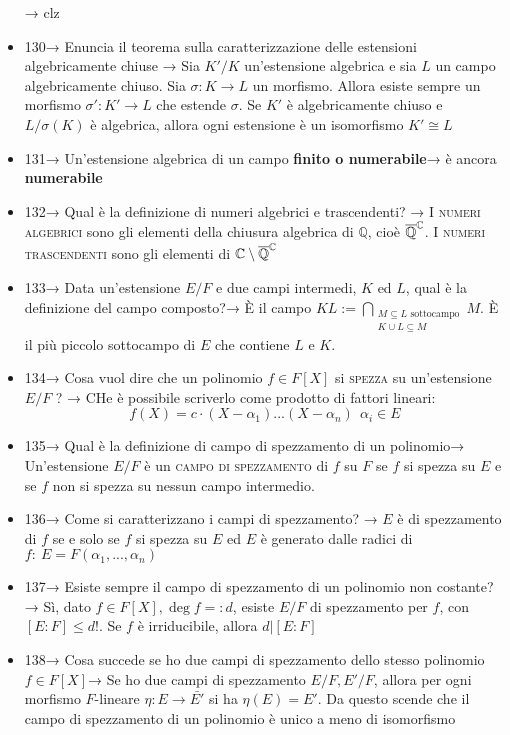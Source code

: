 \documentclass[A4,12pt]{article}
\newcommand{\C}{\mathbb{C}}
\newcommand{\Q}{\mathbb{Q}}
\renewcommand{\subset}{\subseteq}
\begin{document}
\begin{itemize}[noitemsep]
\begin{enumerate}
		\end{enumerate}→ clz
		\item 130→ Enuncia il teorema sulla caratterizzazione delle estensioni algebricamente chiuse → Sia $ K'/K $ un'estensione algebrica e sia $ L $ un campo algebricamente chiuso. Sia $ \sigma:K\to L $ un morfismo. Allora esiste sempre un morfismo $ \sigma':K'\to L $ che estende $ \sigma $. Se $ K' $ è algebricamente chiuso e $ L/\sigma(K) $ è algebrica, allora ogni estensione è un isomorfismo $ K'\cong L $
		\item 131→ Un'estensione algebrica di un campo \textbf{finito o numerabile}→ è ancora \textbf{numerabile}
		\item 132→ Qual è la definizione di numeri algebrici e trascendenti? → I \textsc{numeri algebrici } sono gli elementi della chiusura algebrica di $ \Q $, cioè $ \overline{\Q}\strut^{\C} $. I \textsc{numeri trascendenti} sono gli elementi di $ \C\setminus \overline{\Q}\strut^{\C}  $
		\item 133→ Data un'estensione $ E/F $ e due campi intermedi, $ K $ ed $ L $, qual è la definizione del campo composto?→ È il campo $ KL:= \bigcap\limits_{\substack{M\subset L\text{ sottocampo}\\ K\cup L\subset M }} M$. È il più piccolo sottocampo di $ E $ che contiene $ L $ e $ K $.
		\item 134→ Cosa vuol dire che un polinomio $ f\in F[X] $ si \textsc{spezza} su un'estensione $ E/F $ ? → CHe è possibile scriverlo come prodotto di fattori lineari: \[ f(X) = c\cdot (X-\alpha_1)...(X-\alpha_n)\ \ \alpha_i \in E\]
		\item 135→ Qual è la definizione di campo di spezzamento di un polinomio→ Un'estensione $ E/F $ è un \textsc{campo di spezzamento} di $ f $ su $ F $ se $ f $ si spezza su $ E $ e se $ f $ non si spezza su nessun campo intermedio.
		\item 136→ Come si caratterizzano i campi di spezzamento? → $ E $ è di spezzamento di $ f $ se e solo se $ f $ si spezza su $ E $ ed $ E $ è generato dalle radici di $ f:\ E=F(\alpha_1,...,\alpha_n) $
		\item 137→ Esiste sempre il campo di spezzamento di un polinomio non costante? → Sì, dato $ f\in F[X], \deg f=:d $, esiste $ E/F $ di spezzamento per $ f $, con $ [E:F]\leq d! $. Se $ f $ è irriducibile, allora $ d|[E:F] $
		\item 138→ Cosa succede se ho due campi di spezzamento dello stesso polinomio $ f\in F[X] $→ Se ho due campi di spezzamento $ E/F, E'/F $, allora per ogni morfismo $ F $-lineare $ \eta:E\to \bar{E'} $ si ha $ \eta(E) = E' $. Da questo scende che il campo di spezzamento di un polinomio è unico a meno di isomorfismo

\end{itemize}
\end{document}

